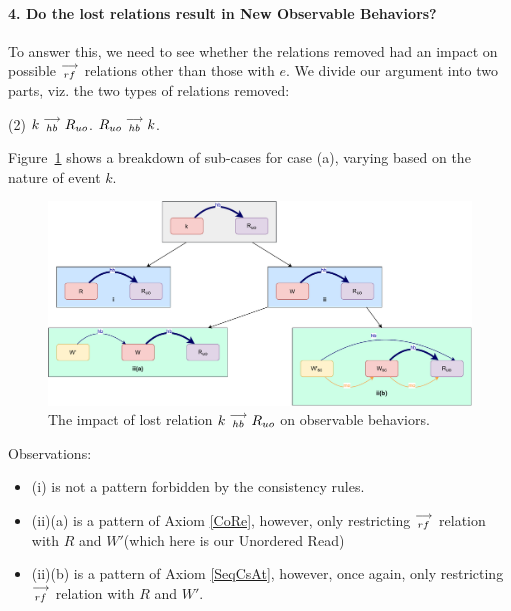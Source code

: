 \paragraph{4. Do the lost relations result in New Observable Behaviors?}

        To answer this, we need to see whether the relations removed had an impact on possible $\stackrel{\longrightarrow}{_{rf}}$ relations other than those with $e$. 
        We divide our argument into two parts, viz. the two types of relations removed:
        \begin{tasks}(2)
            \task $k\stackrel{\longrightarrow}{_{hb}}R_{uo}$. 
            \task $R_{uo}\stackrel{\longrightarrow}{_{hb}}k$.
        \end{tasks}

        Figure~\ref{elim_read:case1} shows a breakdown of sub-cases for case (a), varying based
        on the nature of event $k$.
        \begin{figure}[H]
            \centering
            \includegraphics[scale=0.5]{6.Elimination/1.ValidEliminationCandidate/ReadElimProof/ProofParts/Part4_Case1.pdf}
            \caption{The impact of lost relation $k\stackrel{\longrightarrow}{_{hb}}R_{uo}$ on observable behaviors.}
            \label{elim_read:case1}
        \end{figure}

        Observations:
        \begin{itemize}
            \item (i) is not a pattern forbidden by the consistency rules.
            \item (ii)(a) is a pattern of Axiom \ref{CoRe}, however, only restricting $\stackrel{\longrightarrow}{_{rf}}$ relation with $R$ and $W'$(which here is our Unordered Read)
            \item (ii)(b) is a pattern of Axiom \ref{SeqCsAt}, however, once again, only restricting $\stackrel{\longrightarrow}{_{rf}}$ relation with $R$ and $W'$. 
        \end{itemize}

